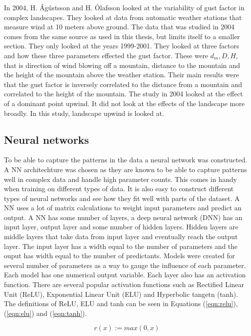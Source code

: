 In 2004, H. Ágústsson and H. Ólafsson\cite{mean_gust_HA_HO} looked at the variability of gust factor in complex landscapes. They looked at data from automatic weather stations that measure wind at 10 meters above ground. The data that was studied in 2004 comes from the same source as used in this thesis, but limits itself to a smaller section. They only looked at the years 1999-2001. They looked at three factors and how these three parameters effected the gust factor. These were $d_m, D, H$, that is direction of wind blowing off a mountain, distance to the mountain and the height of the mountain above the weather station. Their main results were that the gust factor is inversely correlated to the distance from a mountain and correlated to the height of the mountain. The study in 2004 looked at the effect of a dominant point upwind. It did not look at the effects of the landscape more broadly. In this study, landscape upwind is looked at.

\subsection{Neural networks}
To be able to capture the patterns in the data a neural network was constructed. A NN architechture was chosen as they are known to be able to capture patterns well in complex data and handle high parameter counts. This comes in handy when training on different types of data. It is also easy to construct different types of neural networks and see how they fit well with parts of the dataset. A NN uses a lot of matrix calculations to weight input parameters and predict an output. A NN has some number of layers, a deep neural network (DNN) has an input layer, output layer and some number of hidden layers. Hidden layers are middle layers that take data from input layer and eventually reach the output layer. The input layer has a width equal to the number of parameters and the ouput has width equal to the number of predictants. Models were created for several number of parameters as a way to gauge the influence of each parameter. Each model has one numerical output variable. Each layer also has an activation function. There are several popular activation functions such as Rectified Linear Unit (ReLU), Exponential Linear Unit (ELU) and Hyperbolic tangetn (tanh). The definitions of ReLU, ELU and tanh can be seen in Equations (\ref{eqn:relu}), (\ref{eqn:elu}) and (\ref{eqn:tanh}). 

\begin{equation}
    \label{eqn:relu}
    r(x):=max(0, x)
\end{equation}

